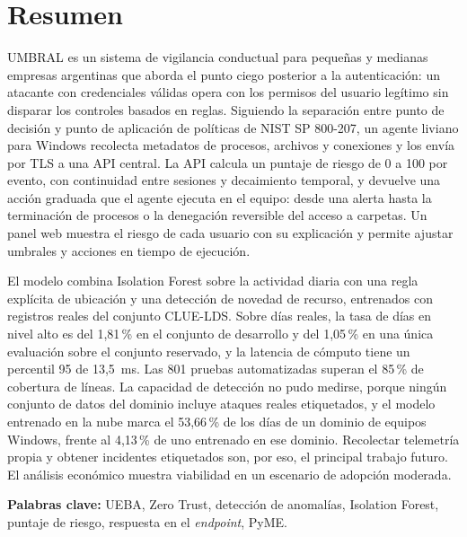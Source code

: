 \chapter*{Resumen}

UMBRAL es un sistema de vigilancia conductual para pequeñas y medianas empresas argentinas que aborda el punto ciego posterior a la autenticación: un atacante con credenciales válidas opera con los permisos del usuario legítimo sin disparar los controles basados en reglas. Siguiendo la separación entre punto de decisión y punto de aplicación de políticas de NIST SP 800-207, un agente liviano para Windows recolecta metadatos de procesos, archivos y conexiones y los envía por TLS a una API central. La API calcula un puntaje de riesgo de 0 a 100 por evento, con continuidad entre sesiones y decaimiento temporal, y devuelve una acción graduada que el agente ejecuta en el equipo: desde una alerta hasta la terminación de procesos o la denegación reversible del acceso a carpetas. Un panel web muestra el riesgo de cada usuario con su explicación y permite ajustar umbrales y acciones en tiempo de ejecución.

El modelo combina Isolation Forest sobre la actividad diaria con una regla explícita de ubicación y una detección de novedad de recurso, entrenados con registros reales del conjunto CLUE-LDS. Sobre días reales, la tasa de días en nivel alto es del 1,81\,\% en el conjunto de desarrollo y del 1,05\,\% en una única evaluación sobre el conjunto reservado, y la latencia de cómputo tiene un percentil 95 de 13,5~ms. Las 801 pruebas automatizadas superan el 85\,\% de cobertura de líneas. La capacidad de detección no pudo medirse, porque ningún conjunto de datos del dominio incluye ataques reales etiquetados, y el modelo entrenado en la nube marca el 53,66\,\% de los días de un dominio de equipos Windows, frente al 4,13\,\% de uno entrenado en ese dominio. Recolectar telemetría propia y obtener incidentes etiquetados son, por eso, el principal trabajo futuro. El análisis económico muestra viabilidad en un escenario de adopción moderada.

\vspace{1em}
\noindent\textbf{Palabras clave:} UEBA, Zero Trust, detección de anomalías, Isolation Forest, puntaje de riesgo, respuesta en el \emph{endpoint}, PyME.
